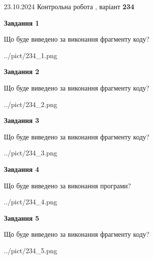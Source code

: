 \documentclass[12pt, ukrainian]{article}
\begin{document}
{\Large{23.10.2024 Контрольна робота , варіант  \No \textbf { 234 }\par}}
{
\begin {large}
{\begin {center}\textbf{Завдання 1}\end {center}}

Що буде виведено за виконання фрагменту коду?\par
\begin{center}
	{../pict/234_1.png}
\end{center}
\newpage

{\begin {center}\textbf{Завдання 2}\end {center}}

Що буде виведено за виконання фрагменту коду?\par
\begin{center}
	{../pict/234_2.png}
\end{center}
\newpage

{\begin {center}\textbf{Завдання 3}\end {center}}

Що буде виведено за виконання фрагменту коду?\par
\begin{center}
	{../pict/234_3.png}
\end{center}
\newpage

{\begin {center}\textbf{Завдання 4}\end {center}}

Що буде виведено за виконання програми?\par
\begin{center}
	{../pict/234_4.png}
\end{center}
\newpage

{\begin {center}\textbf{Завдання 5}\end {center}}

Що буде виведено за виконання фрагменту коду?\par
\begin{center}
	{../pict/234_5.png}
\end{center}
\newpage


\end{large}}
\end{document}
